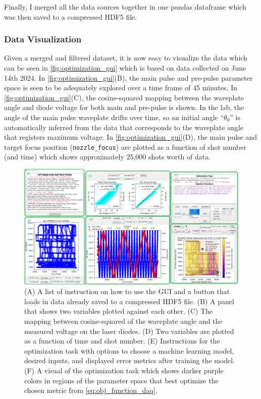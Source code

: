 Finally, I merged all the data sources together in one pandas dataframe which was then saved to a compressed \gls{HDF5} file.

\subsubsection{Data Visualization}
Given a merged and filtered dataset, it is now easy to visualize the data which can be seen in \autoref{fig:optimization_gui} which is based on data collected on June 14th 2024. In \autoref{fig:optimization_gui}(B), the main pulse and pre-pulse parameter space is seen to be adequately explored over a time frame of 45 minutes. In \autoref{fig:optimization_gui}(C), the cosine-squared mapping between the waveplate angle and diode voltage for both main and pre-pulse is shown. In the lab, the angle of the main pulse waveplate drifts over time, so an initial angle ``$\theta_0$'' is automatically inferred from the data that corresponds to the waveplate angle that registers maximum voltage. In \autoref{fig:optimization_gui}(D), the main pulse and target focus position (\texttt{nozzle\_focus}) are plotted as a function of shot number (and time) which shows approximately 25,000 shots worth of data.

\begin{figure}
	\centering 
	\includegraphics[width=\linewidth]{planning/images/daq/optimization_gui.png}
	\caption{(A) A list of instruction on how to use the \gls{GUI} and a button that loads in data already saved to a compressed \gls{HDF5} file. (B) A panel that shows two variables plotted against each other. (C) The mapping between cosine-squared of the waveplate angle and the measured voltage on the laser diodes. (D) Two variables are plotted as a function of time and shot number. (E) Instructions for the optimization task with options to choose a machine learning model, desired inputs, and displayed error metrics after training the model. (F) A visual of the optimization task which shows darker purple colors in regions of the parameter space that best optimize the chosen metric from \autoref{eq:obj_function_daq}.}
	\label{fig:optimization_gui}
\end{figure}

